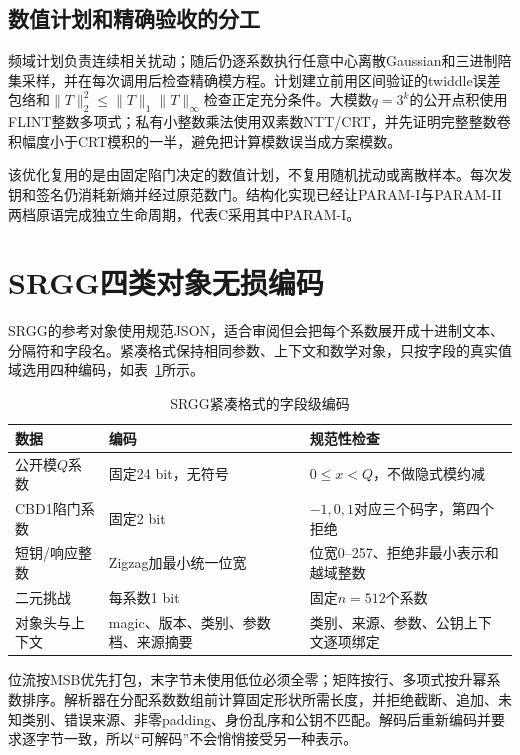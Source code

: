 \documentclass[UTF8,a4paper,12pt,oneside,openany,fontset=fandol]{ctexrep}
\begin{document}
\subsection{数值计划和精确验收的分工}
频域计划负责连续相关扰动；随后仍逐系数执行任意中心离散Gaussian和三进制陪集采样，并在每次调用后检查精确模方程。计划建立前用区间验证的twiddle误差包络和$\lVert T\rVert_2^2\leq\lVert T\rVert_1\lVert T\rVert_\infty$检查正定充分条件。大模数$q=3^k$的公开点积使用FLINT整数多项式；私有小整数乘法使用双素数NTT/CRT，并先证明完整整数卷积幅度小于CRT模积的一半，避免把计算模数误当成方案模数。

该优化复用的是由固定陷门决定的数值计划，不复用随机扰动或离散样本。每次发钥和签名仍消耗新熵并经过原范数门。结构化实现已经让PARAM-I与PARAM-II两档原语完成独立生命周期，代表C采用其中PARAM-I。

\section{SRGG四类对象无损编码}
SRGG的参考对象使用规范JSON，适合审阅但会把每个系数展开成十进制文本、分隔符和字段名。紧凑格式保持相同参数、上下文和数学对象，只按字段的真实值域选用四种编码，如表~\ref{tab:srgg-codec-fields}所示。

\begin{table}[htbp]
\centering
\small
\caption{SRGG紧凑格式的字段级编码}
\label{tab:srgg-codec-fields}
\begin{tabularx}{\textwidth}{@{}>{\raggedright\arraybackslash}p{}>{\raggedright\arraybackslash}p{}>{\raggedright\arraybackslash}X@{}}
\toprule
\rowcolor{black!8} 数据 & 编码 & 规范性检查 \\
\midrule
公开模$Q$系数 & 固定24 bit，无符号 & $0\leq x<Q$，不做隐式模约减 \\
CBD1陷门系数 & 固定2 bit & $-1,0,1$对应三个码字，第四个拒绝 \\
短钥/响应整数 & Zigzag加最小统一位宽 & 位宽0--257、拒绝非最小表示和越域整数 \\
二元挑战 & 每系数1 bit & 固定$n=512$个系数 \\
对象头与上下文 & magic、版本、类别、参数档、来源摘要 & 类别、来源、参数、公钥上下文逐项绑定 \\
\bottomrule
\end{tabularx}
\end{table}

位流按MSB优先打包，末字节未使用低位必须全零；矩阵按行、多项式按升幂系数排序。解析器在分配系数数组前计算固定形状所需长度，并拒绝截断、追加、未知类别、错误来源、非零padding、身份乱序和公钥不匹配。解码后重新编码并要求逐字节一致，所以“可解码”不会悄悄接受另一种表示。
\end{document}
